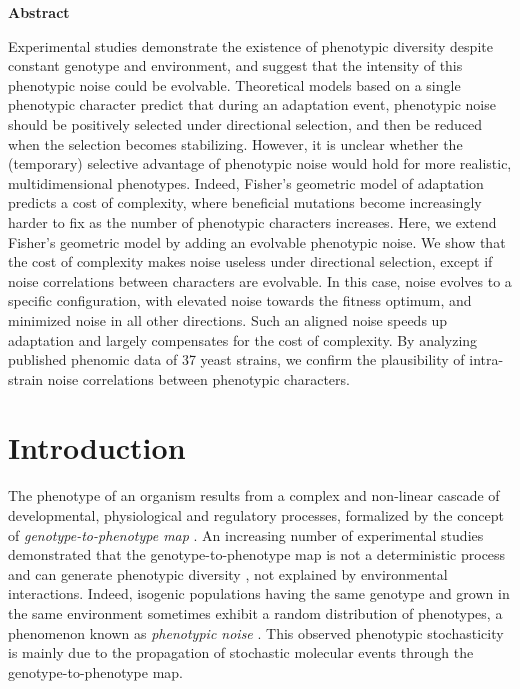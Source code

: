 \begin{center}
\colorbox{grisclair}{
\begin{minipage}[t]{0.9\textwidth}
\begin{center}
\large{\textbf{Abstract}}
\end{center}
Experimental studies demonstrate the existence of phenotypic diversity despite constant genotype and environment, and suggest that the intensity of this phenotypic noise could be evolvable. Theoretical models based on a single phenotypic character predict that during an adaptation event, phenotypic noise should be positively selected under directional selection, and then be reduced when the selection becomes stabilizing. However, it is unclear whether the (temporary) selective advantage of phenotypic noise would hold for more realistic, multidimensional phenotypes. Indeed, Fisher's geometric model of adaptation predicts a cost of complexity, where beneficial mutations become increasingly harder to fix as the number of phenotypic characters increases. Here, we extend Fisher's geometric model by adding an evolvable phenotypic noise. We show that the cost of complexity makes noise useless under directional selection, except if noise correlations between characters are evolvable. In this case, noise evolves to a specific configuration, with elevated noise towards the fitness optimum, and minimized noise in all other directions. Such an aligned noise speeds up adaptation and largely compensates for the cost of complexity. By analyzing published phenomic data of 37 yeast strains, we confirm the plausibility of intra-strain noise correlations between phenotypic characters.
\end{minipage}
}     
\end{center}


\section{Introduction}

The phenotype of an organism results from a complex and non-linear cascade of developmental, physiological and regulatory processes, formalized by the concept of \textit{genotype-to-phenotype map} \citep{alberch-1991}.
An increasing number of experimental studies demonstrated that the genotype-to-phenotype map is not a deterministic process and can generate phenotypic diversity \citep{symmons-and-raj-2016}, not explained by environmental interactions.
Indeed, isogenic populations having the same genotype and grown in the same environment sometimes exhibit a random distribution of phenotypes, a phenomenon known as \textit{phenotypic noise} \citep{yvert-et-al-2013}.
This observed phenotypic stochasticity is mainly due to the propagation of stochastic molecular events \citep{elowitz-et-al-2002,jo-et-al-2005,raser-and-oshea-2005,bahar-et-al-2006,dar-et-al-2014} through the genotype-to-phenotype map.

